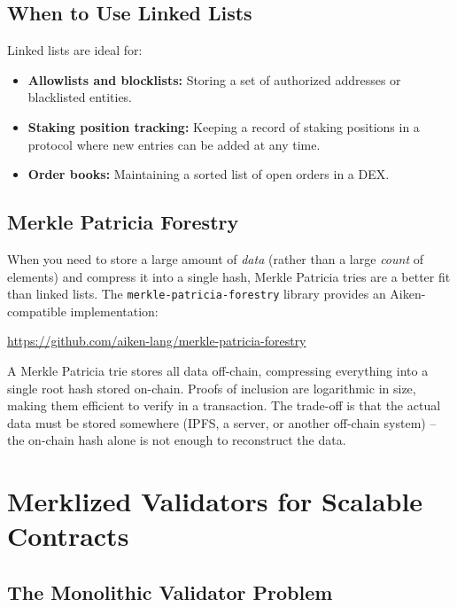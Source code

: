 \subsection{When to Use Linked Lists}

Linked lists are ideal for:
\begin{itemize}
    \item \textbf{Allowlists and blocklists:} Storing a set of authorized addresses or blacklisted entities.
    \item \textbf{Staking position tracking:} Keeping a record of staking positions in a protocol where new entries can be added at any time.
    \item \textbf{Order books:} Maintaining a sorted list of open orders in a DEX.
\end{itemize}

\subsection{Merkle Patricia Forestry}

When you need to store a large amount of \textit{data} (rather than a large \textit{count} of elements) and compress it into a single hash, Merkle Patricia tries are a better fit than linked lists. The \texttt{merkle-patricia-forestry} library provides an Aiken-compatible implementation:

\begin{center}
\url{https://github.com/aiken-lang/merkle-patricia-forestry}
\end{center}

A Merkle Patricia trie stores all data off-chain, compressing everything into a single root hash stored on-chain. Proofs of inclusion are logarithmic in size, making them efficient to verify in a transaction. The trade-off is that the actual data must be stored somewhere (IPFS, a server, or another off-chain system) -- the on-chain hash alone is not enough to reconstruct the data.

\section{Merklized Validators for Scalable Contracts} \label{sec:merklized-validators}

\subsection{The Monolithic Validator Problem}

